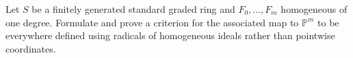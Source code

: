 \begin{problem}\label{chal:vi38-01}
Let \(S\) be a finitely generated standard graded ring and \(F_0,\ldots,F_m\) homogeneous of one degree.  Formulate and prove a criterion for the associated map to \(\mathbb P^m\) to be everywhere defined using radicals of homogeneous ideals rather than pointwise coordinates.
\end{problem}
